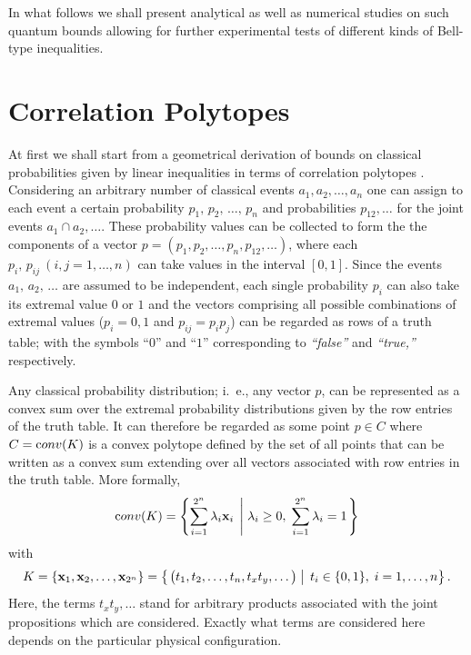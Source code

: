 \documentclass[pra,amsmath,amsfonts,showkeys,showpacs,preprint]{revtex4}
\begin{document}
In what follows we shall present analytical as well as numerical
studies on such quantum bounds allowing for further experimental
tests of different kinds of Bell-type inequalities.

\section{Correlation Polytopes}

At first we shall start from a geometrical derivation of bounds on
classical probabilities given by linear inequalities in
terms of correlation polytopes
\cite{froissart81,pitowsky89,pitowsky01a,
  pitowsky94,tsirelson80}.
Considering an arbitrary number of classical events $a_1, a_2,\ldots ,
a_n$ one can assign to each event a certain probability
$p_1,\,p_2,\,\ldots,\,p_n$ and probabilities $p_{12},\ldots$ for the joint
events $a_1 \cap a_2,\ldots$. These probability values can be
collected to form the the components
of a vector $p=(p_1, p_2,\ldots , p_n, p_{12},\ldots )$,  where each
 $p_i,\,p_{ij}\ (i,j = 1,\ldots, n)$ can take values in the interval $[0,1]$.
 Since the events $a_1,\,a_2,\,\ldots$ are assumed to be independent,
 each single probability $p_i$ can also take its extremal value $0$ or
 $1$ and the
 vectors comprising all possible combinations of extremal values ($p_i=0,1$ and $p_{ij}=p_i p_j$) can be regarded
 as rows of a truth table; with the symbols ``$0$'' and ``$1$'' corresponding to \emph{``false''} and
 \emph{``true,''} respectively.

Any classical probability distribution; i.~e., any vector $p$, can be represented as a convex
sum over the extremal probability distributions given by the row
entries of the truth table. It can therefore be regarded as some point
$p \in C$ where $C={\textrm conv} (K)$ is a convex polytope defined by
the set of all points that can be written as a convex sum extending
over all vectors associated with row entries in the truth table. More formally,
\begin{equation}
  {\textrm conv} (K)=\left\{ \sum_{i=1}^{2^n} \lambda_i{\bf x}_i \;
\left| \; \lambda_i\ge 0,\; \sum_{i=1}^{2^n}\lambda_i =1 \right.
\right\}
\end{equation}
with
\begin{equation}
K = \{{\bf x}_1,{\bf x}_2,\ldots ,{\bf x}_{2^n}\} = \left\{ \left.
\big(t_1, t_2,\ldots , t_n, t_xt_y,\ldots \big) \; \right| \; t_i
\in \{0,1\},\; i=1,\ldots ,n \right\}.
\end{equation}
 Here, the terms
$t_xt_y,\ldots$ stand for arbitrary products associated with the joint
propositions which are considered. Exactly what terms are considered
here depends on the particular physical configuration.
\end{document}
